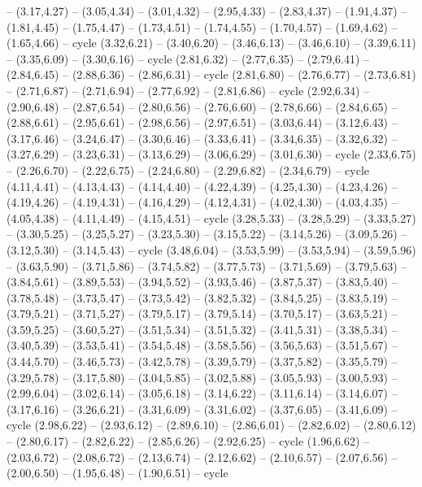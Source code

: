 {-- (3.17,4.27) -- (3.05,4.34) -- (3.01,4.32) -- (2.95,4.33) -- (2.83,4.37) -- (1.91,4.37) -- (1.81,4.45) -- (1.75,4.47) -- (1.73,4.51) -- (1.74,4.55) -- (1.70,4.57) -- (1.69,4.62) -- (1.65,4.66) -- cycle
  (3.32,6.21) -- (3.40,6.20) -- (3.46,6.13) -- (3.46,6.10) -- (3.39,6.11) -- (3.35,6.09) -- (3.30,6.16) -- cycle
  (2.81,6.32) -- (2.77,6.35) -- (2.79,6.41) -- (2.84,6.45) -- (2.88,6.36) -- (2.86,6.31) -- cycle
  (2.81,6.80) -- (2.76,6.77) -- (2.73,6.81) -- (2.71,6.87) -- (2.71,6.94) -- (2.77,6.92) -- (2.81,6.86) -- cycle
  (2.92,6.34) -- (2.90,6.48) -- (2.87,6.54) -- (2.80,6.56) -- (2.76,6.60) -- (2.78,6.66) -- (2.84,6.65) -- (2.88,6.61) -- (2.95,6.61) -- (2.98,6.56) -- (2.97,6.51) -- (3.03,6.44) -- (3.12,6.43) -- (3.17,6.46) -- (3.24,6.47) -- (3.30,6.46) -- (3.33,6.41) -- (3.34,6.35) -- (3.32,6.32) -- (3.27,6.29) -- (3.23,6.31) -- (3.13,6.29) -- (3.06,6.29) -- (3.01,6.30) -- cycle
  (2.33,6.75) -- (2.26,6.70) -- (2.22,6.75) -- (2.24,6.80) -- (2.29,6.82) -- (2.34,6.79) -- cycle
  (4.11,4.41) -- (4.13,4.43) -- (4.14,4.40) -- (4.22,4.39) -- (4.25,4.30) -- (4.23,4.26) -- (4.19,4.26) -- (4.19,4.31) -- (4.16,4.29) -- (4.12,4.31) -- (4.02,4.30) -- (4.03,4.35) -- (4.05,4.38) -- (4.11,4.49) -- (4.15,4.51) -- cycle
  (3.28,5.33) -- (3.28,5.29) -- (3.33,5.27) -- (3.30,5.25) -- (3.25,5.27) -- (3.23,5.30) -- (3.15,5.22) -- (3.14,5.26) -- (3.09,5.26) -- (3.12,5.30) -- (3.14,5.43) -- cycle
  (3.48,6.04) -- (3.53,5.99) -- (3.53,5.94) -- (3.59,5.96) -- (3.63,5.90) -- (3.71,5.86) -- (3.74,5.82) -- (3.77,5.73) -- (3.71,5.69) -- (3.79,5.63) -- (3.84,5.61) -- (3.89,5.53) -- (3.94,5.52) -- (3.93,5.46) -- (3.87,5.37) -- (3.83,5.40) -- (3.78,5.48) -- (3.73,5.47) -- (3.73,5.42) -- (3.82,5.32) -- (3.84,5.25) -- (3.83,5.19) -- (3.79,5.21) -- (3.71,5.27) -- (3.79,5.17) -- (3.79,5.14) -- (3.70,5.17) -- (3.63,5.21) -- (3.59,5.25) -- (3.60,5.27) -- (3.51,5.34) -- (3.51,5.32) -- (3.41,5.31) -- (3.38,5.34) -- (3.40,5.39) -- (3.53,5.41) -- (3.54,5.48) -- (3.58,5.56) -- (3.56,5.63) -- (3.51,5.67) -- (3.44,5.70) -- (3.46,5.73) -- (3.42,5.78) -- (3.39,5.79) -- (3.37,5.82) -- (3.35,5.79) -- (3.29,5.78) -- (3.17,5.80) -- (3.04,5.85) -- (3.02,5.88) -- (3.05,5.93) -- (3.00,5.93) -- (2.99,6.04) -- (3.02,6.14) -- (3.05,6.18) -- (3.14,6.22) -- (3.11,6.14) -- (3.14,6.07) -- (3.17,6.16) -- (3.26,6.21) -- (3.31,6.09) -- (3.31,6.02) -- (3.37,6.05) -- (3.41,6.09) -- cycle
  (2.98,6.22) -- (2.93,6.12) -- (2.89,6.10) -- (2.86,6.01) -- (2.82,6.02) -- (2.80,6.12) -- (2.80,6.17) -- (2.82,6.22) -- (2.85,6.26) -- (2.92,6.25) -- cycle
  (1.96,6.62) -- (2.03,6.72) -- (2.08,6.72) -- (2.13,6.74) -- (2.12,6.62) -- (2.10,6.57) -- (2.07,6.56) -- (2.00,6.50) -- (1.95,6.48) -- (1.90,6.51) -- cycle
}
